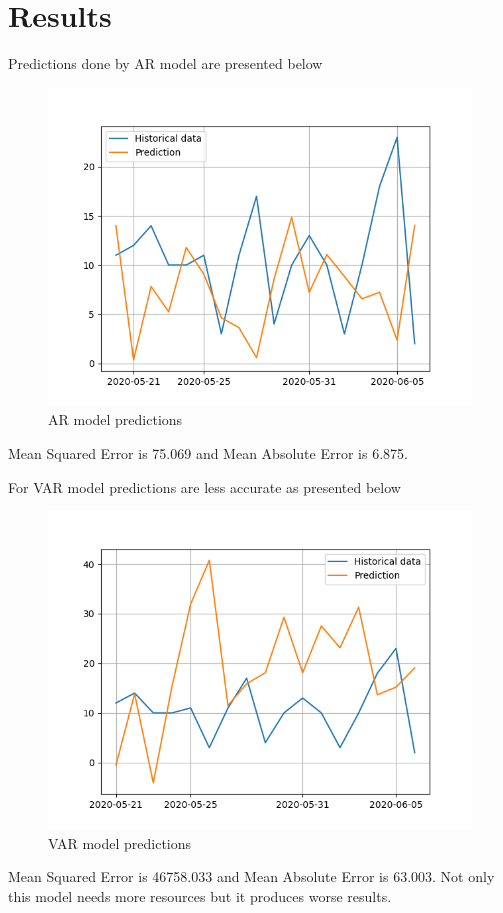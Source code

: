 \documentclass[conference]{IEEEtran}
\begin{document}
\section{Results}
Predictions done by AR model are presented below

\begin{figure}[h!]
    \includegraphics[width=\linewidth]{images/AR_pred.png}
    \caption{AR model predictions}
    \label{fig:AR_pred}
\end{figure}
Mean Squared Error is 75.069 and Mean Absolute Error is 6.875. 

For VAR model predictions are less accurate as presented below
\begin{figure}[h!]
    \includegraphics[width=\linewidth]{images/VAR_pred.png}
    \caption{VAR model predictions}
    \label{fig:VAR_pred}
\end{figure}
Mean Squared Error is 46758.033 and Mean Absolute Error is 63.003. Not only this model needs more resources but it produces worse results.
\end{document}
